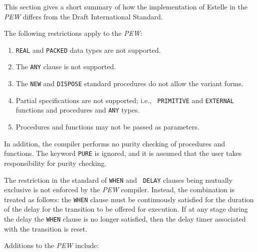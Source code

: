 This section gives a short summary of how the
implementation of Estelle in the {\em PEW} differs from the Draft
International Standard.

The following restrictions apply to the {\em PEW}:

\begin{enumerate}
\item {\tt REAL} and {\tt PACKED} data types are not supported.
\item The {\tt ANY} clause is not supported.
\item The {\tt NEW} and {\tt DISPOSE} standard procedures do not
allow the variant forms.
\item Partial specifications are not supported; i.e., {\tt
PRIMITIVE} and {\tt EXTERNAL} functions and procedures and {\tt ANY} types.
\item Procedures and functions may not be passed as parameters.
\end{enumerate}
In addition, the compiler performs no purity checking of procedures
and functions. The keyword {\tt PURE} is ignored, and it is assumed
that the user takes responsibility for purity checking. 

The restriction in the standard of {\tt WHEN} and {\tt
DELAY} clauses being mutually exclusive is not enforced by the {\em
PEW} compiler. Instead, the combination is treated as follows: the
{\tt WHEN} clause must be continuously satisfied for the duration of 
the delay for the transition to be offered for execution. If at any stage 
during the delay the {\tt WHEN} clause is no longer satisfied, then the 
delay timer associated with the transition is reset.

Additions to the {\em PEW} include:

